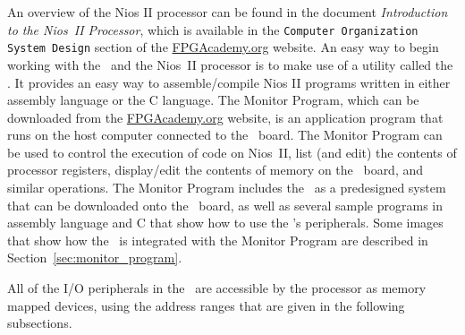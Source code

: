 
An overview of the Nios II processor can be found in the document {\it Introduction to the
Nios~II Processor}, which is available in the
\texttt{Computer Organization System Design} section of the 
{\small \href{https://www.fpgacademy.org/tutorials.html} {FPGAcademy.org}} website.
An easy way to begin working with the \systemName~and the Nios~II
processor is to make use of a utility called the {\it \productNameMed{}}.  It
provides an easy way to assemble/compile Nios II programs 
written in either assembly language or the C language. The Monitor 
Program, which can be downloaded from the
{\small \href{https://www.fpgacademy.org/tools.html} {FPGAcademy.org}} website,
is an application program that 
runs on the host computer connected to the \DEBoard~board.  The Monitor Program can be 
used to control
the execution of code on Nios~II, list (and edit) the contents of processor registers, 
display/edit the contents of memory on the \DEBoard~board, and similar operations.
The Monitor Program includes the \systemName~as a predesigned system that can be
downloaded onto the \DEBoard~board, as well as several sample programs in assembly language and
C that show how to use the \systemName's peripherals.
Some images that show how the \systemName~is integrated with the 
Monitor Program are described in Section~\ref{sec:monitor_program}.

All of the I/O peripherals in the \systemName~are
accessible by the processor as memory mapped devices, 
using the address ranges that are given in the following subsections.


